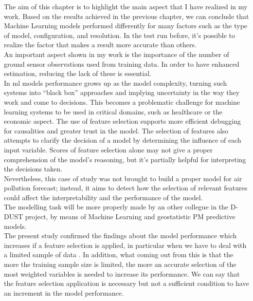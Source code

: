 The aim of this chapter is to highlight the main aspect that I have realized in my work.
Based on the results achieved in the previous chapter, we can conclude that Machine Learning models performed differently for many factors such as the type of model, configuration, and resolution.
In the test run before, it's possible to realize the factor that makes a result more accurate than others.\\
An important aspect shown in my work is the importance of the number of ground sensor observations used from training data. In order to have enhanced estimation, reducing the lack of these is essential.\\
In \acrshort{ml} models performance grows up as the model complexity, turning such systems into “black box” approaches and implying uncertainty in the way they work and come to decisions. 
This becomes a problematic challenge for machine learning systems to be used in critical domains, such as healthcare or the economic aspect.
The use of feature selection supports more efficient debugging for causalities and greater trust in the model.
The selection of features also attempts to clarify the decision of a model by determining the influence of each input variable. 
Scores of feature selection alone may not give a proper comprehension of the model’s reasoning, but it's partially helpful for interpreting the decisions taken.\\
Nevertheless, this case of study was not brought to build a proper model for air pollution forecast; instead, it aims to detect how the selection of relevant features could affect the interpretability and the performance of the model. \\
The modelling task will be more properly made by an other collegue in the D-DUST project, by means of Machine Learning and geostatistic PM predictive models.\\
The present study confirmed the findings about the model performance which increases if a feature selection is applied, in particular when we have to deal with a limited sample of data \cite{vabalas2019machine}. 
In addition, what coming out from this is that the more the training sample size is limited, the more an accurate selection of the most weighted variables is needed to increase its performance.
We can say that the feature selection application is necessary but not a sufficient condition to have an increment in the model performance.
\begin{comment}
In this work, so it is highlighted the effect of how the training in \acrshort{ml} should benefit from an accurate selection of variables. 
\end{comment}
